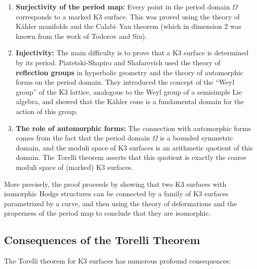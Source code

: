 \begin{enumerate}
    \item \textbf{Surjectivity of the period map:} Every point in the period domain \(\Omega\) corresponds to a marked K3 surface. This was proved using the theory of K\"{a}hler manifolds and the Calabi--Yau theorem (which in dimension 2 was known from the work of Todorov and Siu).

    \item \textbf{Injectivity:} The main difficulty is to prove that a K3 surface is determined by its period. Piatetski-Shapiro and Shafarevich used the theory of \textbf{reflection groups} in hyperbolic geometry and the theory of automorphic forms on the period domain. They introduced the concept of the ``Weyl group'' of the K3 lattice, analogous to the Weyl group of a semisimple Lie algebra, and showed that the K\"{a}hler cone is a fundamental domain for the action of this group.

    \item \textbf{The role of automorphic forms:} The connection with automorphic forms comes from the fact that the period domain \(\Omega\) is a bounded symmetric domain, and the moduli space of K3 surfaces is an arithmetic quotient of this domain. The Torelli theorem asserts that this quotient is exactly the coarse moduli space of (marked) K3 surfaces.
\end{enumerate}

More precisely, the proof proceeds by showing that two K3 surfaces with isomorphic Hodge structures can be connected by a family of K3 surfaces parametrized by a curve, and then using the theory of deformations and the properness of the period map to conclude that they are isomorphic.

\subsection{Consequences of the Torelli Theorem}

The Torelli theorem for K3 surfaces has numerous profound consequences:

